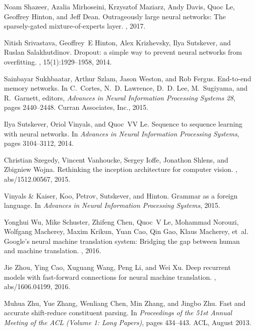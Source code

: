 \documentclass{article}
\begin{document}
\begin{thebibliography}{10}
Noam Shazeer, Azalia Mirhoseini, Krzysztof Maziarz, Andy Davis, Quoc Le,
  Geoffrey Hinton, and Jeff Dean.
\newblock Outrageously large neural networks: The sparsely-gated
  mixture-of-experts layer.
, 2017.

Nitish Srivastava, Geoffrey~E Hinton, Alex Krizhevsky, Ilya Sutskever, and
  Ruslan Salakhutdinov.
\newblock Dropout: a simple way to prevent neural networks from overfitting.
, 15(1):1929--1958, 2014.

Sainbayar Sukhbaatar, Arthur Szlam, Jason Weston, and Rob Fergus.
\newblock End-to-end memory networks.
\newblock In C.~Cortes, N.~D. Lawrence, D.~D. Lee, M.~Sugiyama, and R.~Garnett,
  editors, {\em Advances in Neural Information Processing Systems 28}, pages
  2440--2448. Curran Associates, Inc., 2015.

Ilya Sutskever, Oriol Vinyals, and Quoc~VV Le.
\newblock Sequence to sequence learning with neural networks.
\newblock In {\em Advances in Neural Information Processing Systems}, pages
  3104--3112, 2014.

Christian Szegedy, Vincent Vanhoucke, Sergey Ioffe, Jonathon Shlens, and
  Zbigniew Wojna.
\newblock Rethinking the inception architecture for computer vision.
, abs/1512.00567, 2015.

{Vinyals {\&} Kaiser}, Koo, Petrov, Sutskever, and Hinton.
\newblock Grammar as a foreign language.
\newblock In {\em Advances in Neural Information Processing Systems}, 2015.

Yonghui Wu, Mike Schuster, Zhifeng Chen, Quoc~V Le, Mohammad Norouzi, Wolfgang
  Macherey, Maxim Krikun, Yuan Cao, Qin Gao, Klaus Macherey, et~al.
\newblock Google's neural machine translation system: Bridging the gap between
  human and machine translation.
, 2016.

Jie Zhou, Ying Cao, Xuguang Wang, Peng Li, and Wei Xu.
\newblock Deep recurrent models with fast-forward connections for neural
  machine translation.
, abs/1606.04199, 2016.

Muhua Zhu, Yue Zhang, Wenliang Chen, Min Zhang, and Jingbo Zhu.
\newblock Fast and accurate shift-reduce constituent parsing.
\newblock In {\em Proceedings of the 51st Annual Meeting of the ACL (Volume 1:
  Long Papers)}, pages 434--443. ACL, August 2013.

\end{thebibliography}

%

%
\end{document}
